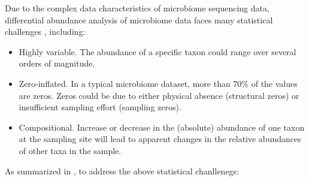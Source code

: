 \documentclass[
]{book}
\begin{document}
Due to the complex data characteristics of microbiome sequencing data, differential abundance analysis of microbiome data faces many statistical challenges \citep{Yang2022}, including:

\begin{itemize}
\item
  Highly variable. The abundance of a specific taxon could range over several orders of magnitude.
\item
  Zero-inflated. In a typical microbiome dataset, more than 70\% of the values are zeros. Zeros could be due to either physical absence (structural zeros) or insufficient sampling effort (sampling zeros).
\item
  Compositional. Increase or decrease in the (absolute) abundance of one taxon at the sampling site will lead to apparent changes in the relative abundances of other taxa in the sample.
\end{itemize}

As summarized in \citet{Yang2022}, to address the above statistical chanllenegs:
\end{document}
